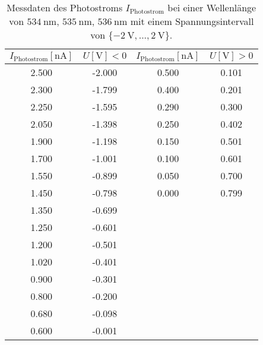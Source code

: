 \begin{table}
    \centering
    \caption{Messdaten des Photostroms $I_{\text{Photostrom}}$ bei einer Wellenlänge von $\SI{534}{\nano\meter}$, $\SI{535}{\nano\meter}$, $\SI{536}{\nano\meter}$ mit einem Spannungsintervall von $\{\SI{-2}{\volt},... ,\SI{2}{\volt}\}$.}
    \label{tab:tab3}
    \begin{tabular}{c c || c c}
        \toprule
        $I_{\text{Photostrom}}[\si{\nano\ampere}]$ & $U [\si{\volt}] < 0$ & $I_{\text{Photostrom}}[\si{\nano\ampere}]$ & $U [\si{\volt}] > 0$ \\
        \midrule
        2.500       &         -2.000   &  0.500         &        0.101    \\       
        2.300       &         -1.799   &  0.400         &        0.201    \\             
        2.250       &         -1.595   &  0.290         &        0.300    \\       
        2.050       &         -1.398   &  0.250         &        0.402    \\             
        1.900       &         -1.198   &  0.150         &        0.501    \\       
        1.700       &         -1.001   &  0.100         &        0.601    \\       
        1.550       &         -0.899   &  0.050         &        0.700    \\       
        1.450       &         -0.798   &  0.000         &        0.799    \\              
        1.350       &         -0.699   &  & \\
        1.250       &         -0.601   &  & \\       
        1.200       &         -0.501   &  & \\
        1.020       &         -0.401   &  & \\       
        0.900       &         -0.301   &  & \\
        0.800       &         -0.200   &  & \\       
        0.680       &         -0.098   &  & \\
        0.600       &         -0.001   &  & \\           

       \bottomrule
    \end{tabular}
\end{table}


